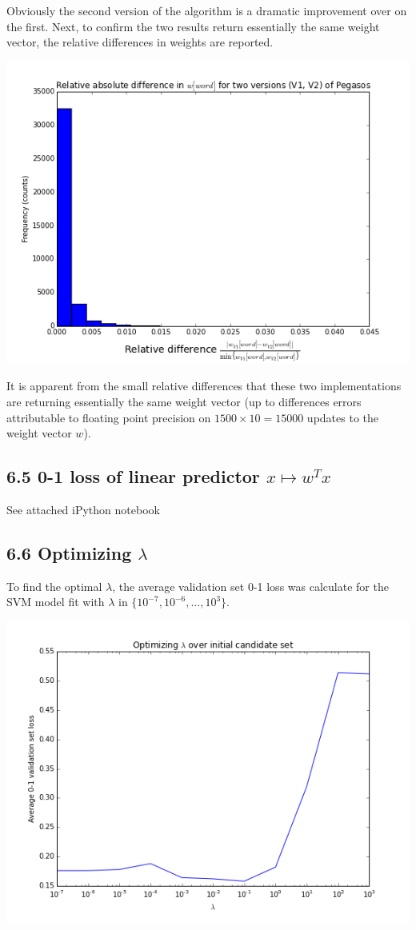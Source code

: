 \documentclass[paper=a4, fontsize=11pt]{scrartcl} %
\numberwithin{equation}{section} %
\numberwithin{figure}{section} %
\numberwithin{table}{section} %
\begin{document}
Obviously the second version of the algorithm is a dramatic improvement over on the first. Next, to confirm the two results return essentially the same weight vector, the relative differences in weights are reported.

\includegraphics[scale = 0.65]{./../figures/6_4.png}

It is apparent from the small relative differences that these two implementations are returning essentially the same weight vector (up to differences errors attributable to floating point precision on $1500 \times 10 = 15000$ updates to the weight vector $w$).

\subsection*{6.5 0-1 loss of linear predictor $x \mapsto w^Tx$}

See attached iPython notebook

\subsection*{6.6 Optimizing $\lambda$}

To find the optimal $\lambda$, the average validation set 0-1 loss was calculate for the SVM model fit with $\lambda$ in $\{10^{-7}, 10^{-6}, \dots, 10^3\}$.

\includegraphics[scale = 0.65] {./../figures/6_6_a.png}
\end{document}
